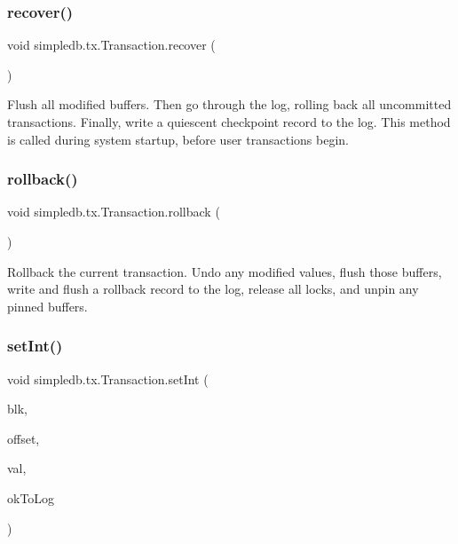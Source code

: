 \subsubsection{\texorpdfstring{recover()}{recover()}}
{\footnotesize\ttfamily void simpledb.\+tx.\+Transaction.\+recover (\begin{DoxyParamCaption}{ }\end{DoxyParamCaption})\hspace{0.3cm}{\ttfamily [inline]}}

Flush all modified buffers. Then go through the log, rolling back all uncommitted transactions. Finally, write a quiescent checkpoint record to the log. This method is called during system startup, before user transactions begin. \mbox{\label{classsimpledb_1_1tx_1_1Transaction_a1fea478b918e70a45caa0521c1686a73}} 
\subsubsection{\texorpdfstring{rollback()}{rollback()}}
{\footnotesize\ttfamily void simpledb.\+tx.\+Transaction.\+rollback (\begin{DoxyParamCaption}{ }\end{DoxyParamCaption})\hspace{0.3cm}{\ttfamily [inline]}}

Rollback the current transaction. Undo any modified values, flush those buffers, write and flush a rollback record to the log, release all locks, and unpin any pinned buffers. \mbox{\label{classsimpledb_1_1tx_1_1Transaction_ade3cfca948f02de979004f34a23a1237}} 
\subsubsection{\texorpdfstring{set\+Int()}{setInt()}}
{\footnotesize\ttfamily void simpledb.\+tx.\+Transaction.\+set\+Int (\begin{DoxyParamCaption}\item[{\hyperlink{classsimpledb_1_1file_1_1BlockId}{Block\+Id}}]{blk,  }\item[{int}]{offset,  }\item[{int}]{val,  }\item[{boolean}]{ok\+To\+Log }\end{DoxyParamCaption})\hspace{0.3cm}{\ttfamily [inline]}}

